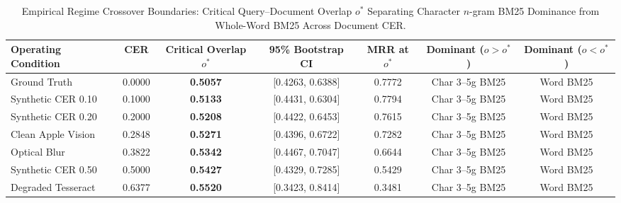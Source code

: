 \begin{table}[htbp]
\centering
\caption{Empirical Regime Crossover Boundaries: Critical Query--Document Overlap $o^*$ Separating Character $n$-gram BM25 Dominance from Whole-Word BM25 Across Document CER.}
\label{tab:regime_crossover}
\begin{tabular}{lcccccc}
\toprule
\textbf{Operating Condition} & \textbf{CER} & \textbf{Critical Overlap $o^*$} & \textbf{95\% Bootstrap CI} & \textbf{MRR at $o^*$} & \textbf{Dominant ($o > o^*$)} & \textbf{Dominant ($o < o^*$)} \\
\midrule
Ground Truth & 0.0000 & \textbf{0.5057} & [0.4263, 0.6388] & 0.7772 & Char 3--5g BM25 & Word BM25 \\
Synthetic CER 0.10 & 0.1000 & \textbf{0.5133} & [0.4431, 0.6304] & 0.7794 & Char 3--5g BM25 & Word BM25 \\
Synthetic CER 0.20 & 0.2000 & \textbf{0.5208} & [0.4422, 0.6453] & 0.7615 & Char 3--5g BM25 & Word BM25 \\
Clean Apple Vision & 0.2848 & \textbf{0.5271} & [0.4396, 0.6722] & 0.7282 & Char 3--5g BM25 & Word BM25 \\
Optical Blur & 0.3822 & \textbf{0.5342} & [0.4467, 0.7047] & 0.6644 & Char 3--5g BM25 & Word BM25 \\
Synthetic CER 0.50 & 0.5000 & \textbf{0.5427} & [0.4329, 0.7285] & 0.5429 & Char 3--5g BM25 & Word BM25 \\
Degraded Tesseract & 0.6377 & \textbf{0.5520} & [0.3423, 0.8414] & 0.3481 & Char 3--5g BM25 & Word BM25 \\
\bottomrule
\end{tabular}
\end{table}
